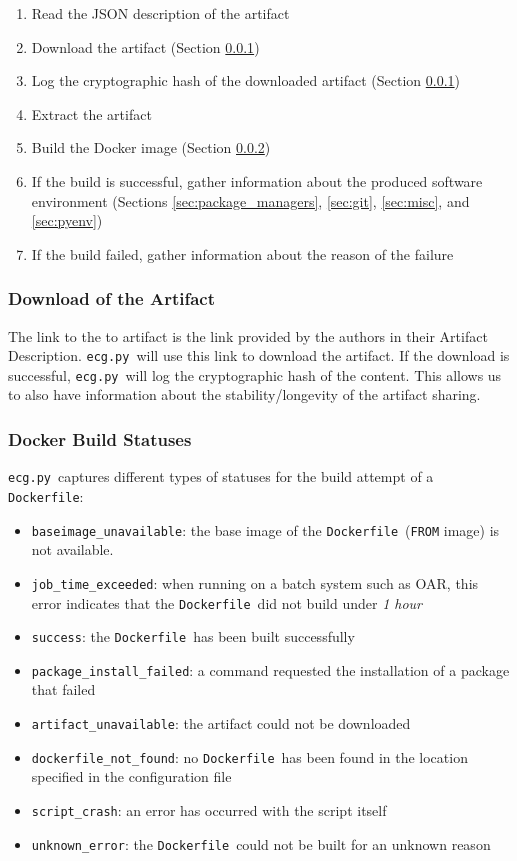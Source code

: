 \documentclass{article}
\newcommand{\noteqg}{\todo[backgroundcolor=blue!10,bordercolor=blue,inline,caption={}]}
\newcommand{\dfile}{\texttt{Dockerfile}}
\newcommand{\ecg}{\texttt{ecg.py}}
\begin{document}
\begin{enumerate}
\item Read the JSON description of the artifact
\item Download the artifact (Section \ref{sec:download})
\item Log the cryptographic hash of the downloaded artifact (Section \ref{sec:download})
\item Extract the artifact
\item Build the Docker image (Section \ref{sec:docker_build})
\item If the build is successful, gather information about the produced software environment (Sections \ref{sec:package_managers}, \ref{sec:git}, \ref{sec:misc}, and \ref{sec:pyenv})
\item If the build failed, gather information about the reason of the failure
\end{enumerate}

\noteqg{should probably be a flowgraph}

\subsubsection{Download of the Artifact}\label{sec:download}

The link to the to artifact is the link provided by the authors in their Artifact Description.
\ecg\ will use this link to download the artifact.
If the download is successful, \ecg\ will log the cryptographic hash of the content.
This allows us to also have information about the stability/longevity of the artifact sharing.

\subsubsection{Docker Build Statuses}\label{sec:docker_build}

\ecg\ captures different types of statuses for the build attempt of a \dfile:

\begin{itemize}
  \item \texttt{baseimage\_unavailable}: the base image of the \dfile\ (\texttt{FROM} image) is not available.
  \item \texttt{job\_time\_exceeded}: when running on a batch system such as OAR, this error indicates that the \dfile\ did not build under \emph{1 hour}
  \item \texttt{success}: the \dfile\ has been built successfully
  \item \texttt{package_install_failed}: a command requested the installation of a package that failed
  \item \texttt{artifact_unavailable}: the artifact could not be downloaded
  \item \texttt{dockerfile_not_found}: no \dfile\ has been found in the location specified in the configuration file
  \item \texttt{script_crash}: an error has occurred with the script itself
  \item \texttt{unknown_error}: the \dfile\ could not be built for an unknown reason
\end{itemize}
\end{document}
